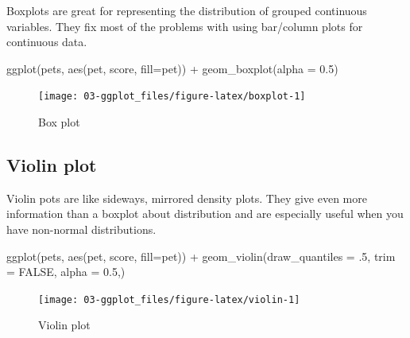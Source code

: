 \documentclass[
  oneside]{book}
\newenvironment{Shaded}{\begin{snugshade}}{\end{snugshade}}
\newcommand{\AttributeTok}[1]{\textcolor[rgb]{0.77,0.63,0.00}{#1}}
\newcommand{\ConstantTok}[1]{\textcolor[rgb]{0.00,0.00,0.00}{#1}}
\newcommand{\DecValTok}[1]{\textcolor[rgb]{0.00,0.00,0.81}{#1}}
\newcommand{\FloatTok}[1]{\textcolor[rgb]{0.00,0.00,0.81}{#1}}
\newcommand{\FunctionTok}[1]{\textcolor[rgb]{0.00,0.00,0.00}{#1}}
\newcommand{\NormalTok}[1]{#1}
\newcommand{\SpecialCharTok}[1]{\textcolor[rgb]{0.00,0.00,0.00}{#1}}
\begin{document}
Boxplots are great for representing the distribution of grouped continuous variables. They fix most of the problems with using bar/column plots for continuous data.

\begin{Shaded}
\begin{Highlighting}[]
\FunctionTok{ggplot}\NormalTok{(pets, }\FunctionTok{aes}\NormalTok{(pet, score, }\AttributeTok{fill=}\NormalTok{pet)) }\SpecialCharTok{+}
  \FunctionTok{geom\_boxplot}\NormalTok{(}\AttributeTok{alpha =} \FloatTok{0.5}\NormalTok{)}
\end{Highlighting}
\end{Shaded}

\begin{figure}

{\centering \texttt{[image: 03-ggplot\_files/figure-latex/boxplot-1]} 

}

\caption{Box plot}\label{fig:boxplot}
\end{figure}

\hypertarget{geom_violin}{%
\subsection{Violin plot}\label{geom_violin}}

Violin pots are like sideways, mirrored density plots. They give even more information than a boxplot about distribution and are especially useful when you have non-normal distributions.

\begin{Shaded}
\begin{Highlighting}[]
\FunctionTok{ggplot}\NormalTok{(pets, }\FunctionTok{aes}\NormalTok{(pet, score, }\AttributeTok{fill=}\NormalTok{pet)) }\SpecialCharTok{+}
  \FunctionTok{geom\_violin}\NormalTok{(}\AttributeTok{draw\_quantiles =}\NormalTok{ .}\DecValTok{5}\NormalTok{,}
              \AttributeTok{trim =} \ConstantTok{FALSE}\NormalTok{, }\AttributeTok{alpha =} \FloatTok{0.5}\NormalTok{,)}
\end{Highlighting}
\end{Shaded}

\begin{figure}

{\centering \texttt{[image: 03-ggplot\_files/figure-latex/violin-1]} 

}

\caption{Violin plot}\label{fig:violin}
\end{figure}
\end{document}
